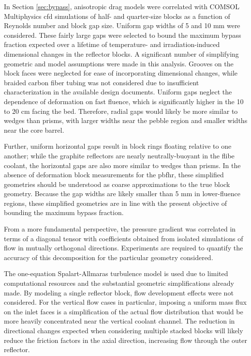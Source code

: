 In Section \ref{sec:bypass}, anisotropic drag models were correlated with COMSOL Multiphysics \gls{cfd} simulations of half- and quarter-size blocks as a function of Reynolds number and block gap size. Uniform gap widths of 5 and 10 \si{\milli\meter} were considered. These fairly large gaps were selected to bound the maximum bypass fraction expected over a lifetime of temperature- and irradiation-induced dimensional changes in the reflector blocks. A significant number of simplifying geometric and model assumptions were made in this analysis. Grooves on the block faces were neglected for ease of incorporating dimensional changes, while braided carbon fiber tubing was not considered due to insufficient characterization in the available design documents. Uniform gaps neglect the dependence of deformation on fast fluence, which is significantly higher in the 10 to 20 \si{\centi\meter} facing the bed. Therefore, radial gaps would likely be more similar to wedges than prisms, with larger widths near the pebble region and smaller widths near the core barrel.

Further, uniform horizontal gaps result in block rings floating relative to one another; while the graphite reflectors are nearly neutrally-buoyant in the \gls{flibe} coolant, the horizontal gaps are also more similar to wedges than prisms. In the absence of deformation block measurements for the \gls{pbfhr}, these simplified geometries should be understood as coarse approximations to the true block geometry. Because the gap widths are likely smaller than 5 \si{\milli\meter} in lower-fluence regions, these simplified geometries are in line with the present objective of bounding the maximum bypass fraction.

From a more fundamental perspective, the pressure gradient was correlated in terms of a diagonal tensor with coefficients obtained from isolated simulations of flow in mutually orthogonal directions. Experiments are required to quantify the accuracy of this decomposition for the particular geometry considered.

The one-equation Spalart-Allmaras turbulence model is used due to limited computational resources and the substantial geometric simplifications already made. By modeling a single reflector block, flow development effects were not considered. For the vertical flow cases in particular, imposing a uniform mass flux on the inlet faces is a simplification of the actual flow distribution that would be more heavily concentrated near the vertical coolant channel. The reduction in directional changes expected when considering multiple stacked blocks will likely reduce the friction factors in the axial direction, increasing flow through the outer reflector.

